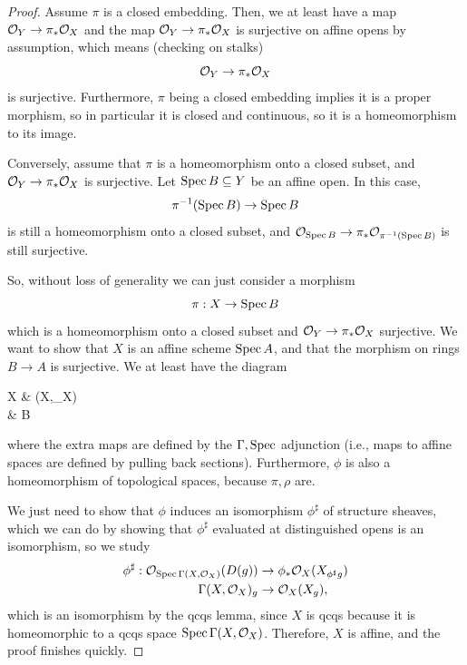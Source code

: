 \documentclass[12pt]{article}
\begin{document}
\begin{proof}
    Assume $\pi$ is a closed embedding. Then, we at least have a map $\mathcal{O}_Y \to \pi_* \mathcal{O}_X$ and the map $\mathcal{O}_Y\to \pi_* \mathcal{O}_X$ is surjective on affine opens by assumption, which means (checking on stalks)
    \[\mathcal{O}_Y \to \pi_*\mathcal{O}_X\]
    is surjective. Furthermore, $\pi$ being a closed embedding implies it is a proper morphism, so in particular it is closed and continuous, so it is a homeomorphism to its image.
    
    Conversely, assume that $\pi$ is a homeomorphism onto a closed subset, and $\mathcal{O}_Y\to \pi_* \mathcal{O}_X$ is surjective. Let $\operatorname{Spec} B\subseteq Y$ be an affine open. In this case,
    \[\pi^{-1}(\operatorname{Spec} B) \to \operatorname{Spec} B\]
    is still a homeomorphism onto a closed subset, and $\mathcal{O}_{\operatorname{Spec} B} \to \pi_*\mathcal{O}_{\pi^{-1}(\operatorname{Spec} B)}$ is still surjective.
    
    So, without loss of generality we can just consider a morphism
    \[\pi: X\to \operatorname{Spec} B\]
    which is a homeomorphism onto a closed subset and $\mathcal{O}_Y \to \pi_* \mathcal{O}_X$ surjective. We want to show that $X$ is an affine scheme $\operatorname{Spec} A$, and that the morphism on rings $B\to A$ is surjective. We at least have the diagram
    \begin{cd}
        X \rar["\phi"] \ar[dr,"\pi"] & \Spec \Gamma(X,\cO_X) \dar["\rho"]\\
        & \Spec B
    \end{cd}
    where the extra maps are defined by the $\Gamma,\operatorname{Spec}$ adjunction (i.e., maps to affine spaces are defined by pulling back sections). Furthermore, $\phi$ is also a homeomorphism of topological spaces, because $\pi, \rho$ are.

    We just need to show that $\phi$ induces an isomorphism $\phi^\sharp$ of structure sheaves, which we can do by showing that $\phi^\sharp$ evaluated at distinguished opens is an isomorphism, so we study
    \begin{align*}
        \phi^\sharp: \cO_{\Spec \Gamma(X,\cO_X)}(D(g)) &\to \phi_* \cO_X(X_{\phi^\sharp g})\\
        \Gamma(X,\cO_X)_g &\to \cO_X(X_g),
    \end{align*}
    which is an isomorphism by the qcqs lemma, since $X$ is qcqs because it is homeomorphic to a qcqs space $\operatorname{Spec} \Gamma(X,\mathcal{O}_X)$. Therefore, $X$ is affine, and the proof finishes quickly.
\end{proof}
\end{document}
